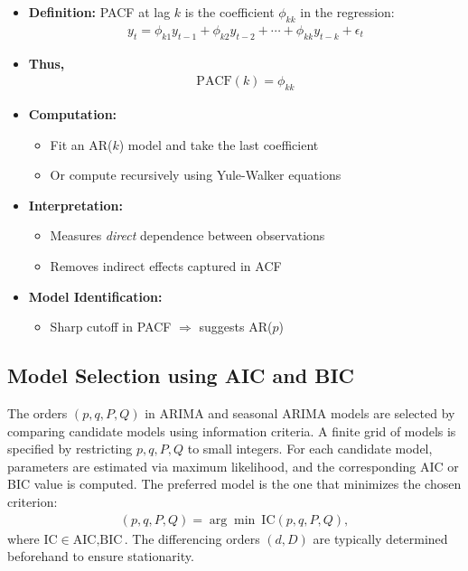 \documentclass[10pt,a4paper]{article}
\begin{document}
	\begin{itemize}
	\item \textbf{Definition:} PACF at lag $k$ is the coefficient $\phi_{kk}$ in the regression:
	\begin{align*}
	y_t = \phi_{k1} y_{t-1} + \phi_{k2} y_{t-2} + \cdots + \phi_{kk} y_{t-k} + \epsilon_t
	\end{align*}
	
	\item \textbf{Thus,}
	\begin{align*}
	\text{PACF}(k) = \phi_{kk}
	\end{align*}
	
	\item \textbf{Computation:}
	\begin{itemize}
	    \item Fit an AR($k$) model and take the last coefficient
	    \item Or compute recursively using Yule-Walker equations
	\end{itemize}
	
	\item \textbf{Interpretation:}
	\begin{itemize}
	    \item Measures \textit{direct} dependence between observations
	    \item Removes indirect effects captured in ACF
	\end{itemize}
	
	\item \textbf{Model Identification:}
	\begin{itemize}
	    \item Sharp cutoff in PACF $\Rightarrow$ suggests AR($p$)
	\end{itemize}
	\end{itemize}
	
	
	\subsection{Model Selection using AIC and BIC}
	
	The orders $(p,q,P,Q)$ in ARIMA and seasonal ARIMA models are selected by comparing candidate models using information criteria. A finite grid of models is specified by restricting $p,q,P,Q$ to small integers. For each candidate model, parameters are estimated via maximum likelihood, and the corresponding AIC or BIC value is computed. The preferred model is the one that minimizes the chosen criterion:
	\begin{align*}
	(p,q,P,Q) = \arg\min \ \text{IC}(p,q,P,Q),
	\end{align*}
	where $\text{IC} \in {\text{AIC}, \text{BIC}}$. The differencing orders $(d,D)$ are typically determined beforehand to ensure stationarity.
	
\end{document}
